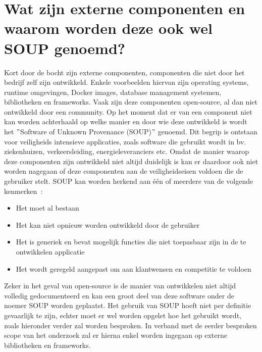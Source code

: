 \section{Wat zijn externe componenten en waarom worden deze ook wel SOUP genoemd?}\label{sec:watisSOUP}
Kort door de bocht zijn externe componenten, componenten die niet door het bedrijf zelf zijn ontwikkeld. Enkele voorbeelden hiervan zijn operating systems, runtime omgevingen, Docker images, database management systemen, bibliotheken en frameworks. Vaak zijn deze componenten open-source, al dan niet ontwikkeld door een community.
Op het moment dat er van een component niet kan worden achterhaald op welke manier en door wie deze ontwikkeld is wordt het $"$Software of Unknown Provenance (SOUP)$"$ genoemd. Dit begrip is ontstaan voor veiligheids intensieve applicaties, zoals software die gebruikt wordt in bv. ziekenhuizen, verkeersleiding, energieleveranciers etc.
Omdat de manier waarop deze componenten zijn ontwikkeld niet altijd duidelijk is kan er daardoor ook niet worden nagegaan of deze componenten aan de veiligheidseisen voldoen die de gebruiker stelt. SOUP kan worden herkend aan één of meerdere van de volgende kenmerken~\citep{Bischop:2001}:
\begin{itemize}
    \item Het moet al bestaan
    \item Het kan niet opnieuw worden ontwikkeld door de gebruiker
    \item Het is generiek en bevat mogelijk functies die niet toepasbaar zijn in de te ontwikkelen applicatie
    \item Het wordt geregeld aangepast om aan klantwensen en competitie te voldoen
\end{itemize}

Zeker in het geval van open-source is de manier van ontwikkelen niet altijd volledig gedocumenteerd en kan een groot deel van deze software onder de noemer SOUP worden geplaatst. Het gebruik van SOUP hoeft niet per definitie gevaarlijk te zijn, echter moet er wel worden opgelet hoe het gebruikt wordt, zoals hieronder verder zal worden besproken. In verband met de eerder besproken scope van het onderzoek zal er hierna enkel worden ingegaan op externe bibliotheken en frameworks.

